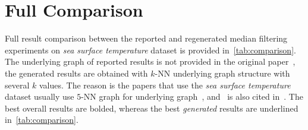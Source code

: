 \documentclass[a4paper,10pt,conference]{IEEEtran}
\begin{document}
\section{Full Comparison}
Full result comparison between the reported and regenerated median filtering experiments on \textit{sea surface temperature} dataset is provided in~\cref{tab:comparison}. The underlying graph of reported results is not provided in the original paper~\cite{median}, the generated results are obtained with \(k\)-NN underlying graph structure with several \(k\) values. The reason is the papers that use the \textit{sea surface temperature} dataset usually use \(5\)-NN graph for underlying graph~\cite{reconstruction,sobolev}, and~\cite{reconstruction} is also cited in~\cite{median}. The best overall results are bolded, whereas the best \textit{generated} results are underlined in~\cref{tab:comparison}.
\end{document}
